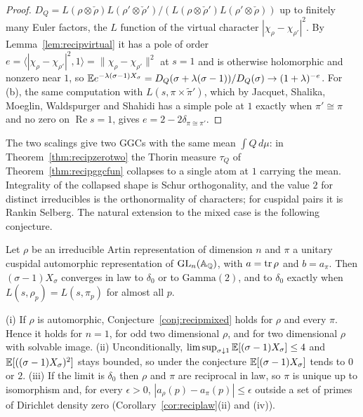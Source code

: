 \begin{proof}
$D_Q=L(\rho\otimes\check\rho)L(\rho'\otimes\check\rho')/(L(\rho\otimes\check\rho')L(\rho'\otimes\check\rho))$ up to finitely many Euler factors, the $L$ function of the virtual character $|\chi_\rho-\chi_{\rho'}|^2$. By Lemma~\ref{lem:recipvirtual} it has a pole of order $e=\langle|\chi_\rho-\chi_{\rho'}|^2,1\rangle=\|\chi_\rho-\chi_{\rho'}\|^2$ at $s=1$ and is otherwise holomorphic and nonzero near $1$, so $\mathbb{E} e^{-\lambda(\sigma-1)X_\sigma}=D_Q(\sigma+\lambda(\sigma-1))/D_Q(\sigma)\to(1+\lambda)^{-e}$. For (b), the same computation with $L(s,\pi\times\tilde\pi')$, which by Jacquet, Shalika, Moeglin, Waldspurger and Shahidi \cite{jacquetshalika1981,moeglinwaldspurger1989,shahidi1981} has a simple pole at $1$ exactly when $\pi'\cong\pi$ and no zero on $\operatorname{Re}s=1$, gives $e=2-2\delta_{\pi\cong\pi'}$.
\end{proof}

The two scalings give two GGCs with the same mean $\int Q\,d\mu$: in Theorem~\ref{thm:recipzerotwo} the Thorin measure $\tau_Q$ of Theorem~\ref{thm:recipggcfun} collapses to a single atom at $1$ carrying the mean. Integrality of the collapsed shape is Schur orthogonality, and the value $2$ for distinct irreducibles is the orthonormality of characters; for cuspidal pairs it is Rankin Selberg. The natural extension to the mixed case is the following conjecture.

\begin{conjecture}\label{conj:recipmixed}
Let $\rho$ be an irreducible Artin representation of dimension $n$ and $\pi$ a unitary cuspidal automorphic representation of $\mathrm{GL}_n(\mathbb{A}_{\mathbb{Q}})$, with $a=\operatorname{tr}\rho$ and $b=a_\pi$. Then $(\sigma-1)X_\sigma$ converges in law to $\delta_0$ or to $\mathrm{Gamma}(2)$, and to $\delta_0$ exactly when $L(s,\rho_p)=L(s,\pi_p)$ for almost all $p$.
\end{conjecture}

\begin{proposition}\label{prop:recipmixed}
(i) If $\rho$ is automorphic, Conjecture~\ref{conj:recipmixed} holds for $\rho$ and every $\pi$. Hence it holds for $n=1$, for odd two dimensional $\rho$, and for two dimensional $\rho$ with solvable image.
(ii) Unconditionally, $\limsup_{\sigma\downarrow1}\mathbb{E}[(\sigma-1)X_\sigma]\le4$ and $\mathbb{E}[((\sigma-1)X_\sigma)^2]$ stays bounded, so under the conjecture $\mathbb{E}[(\sigma-1)X_\sigma]$ tends to $0$ or $2$.
(iii) If the limit is $\delta_0$ then $\rho$ and $\pi$ are reciprocal in law, so $\pi$ is unique up to isomorphism and, for every $\epsilon>0$, $|a_\rho(p)-a_\pi(p)|\le\epsilon$ outside a set of primes of Dirichlet density zero (Corollary~\ref{cor:reciplaw}(ii) and (iv)).
\end{proposition}

